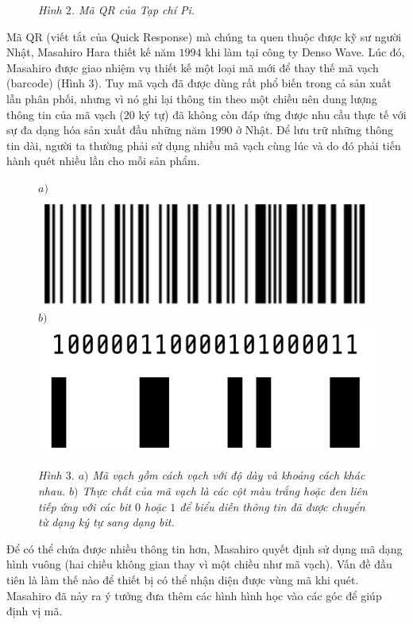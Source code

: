\begin{multicols}{2}
\begin{figure}[H]
			\caption{\small\textit{\color{toanhocdoisong}Hình $2$. Mã QR của Tạp chí Pi.}}
			\vspace*{-10pt}
		\end{figure}
	Mã QR (viết tắt của Quick Response) mà chúng ta quen thuộc được kỹ sư người Nhật, Masahiro Hara thiết kế năm $1994$ khi làm tại công ty Denso Wave. Lúc đó, Masahiro được giao nhiệm vụ thiết kế một loại mã mới để thay thế mã vạch (barcode) (Hình $3$). Tuy mã vạch đã được dùng rất phổ biến trong cả sản xuất lẫn phân phối, nhưng vì nó ghi lại thông tin theo một chiều nên dung lượng thông tin của mã vạch ($20$ ký tự) đã không còn đáp ứng được nhu cầu thực tế với sự đa dạng hóa sản xuất đầu những năm $1990$ ở Nhật. Để lưu trữ những thông tin dài, người ta thường phải sử dụng nhiều mã vạch cùng lúc và do đó phải tiến hành quét nhiều lần cho mỗi sản phẩm.
	\begin{figure}[H]
		\vspace*{-10pt}
		\centering
		\captionsetup{labelformat= empty, justification=centering}
		$a)$\includegraphics[width= 0.8\linewidth]{4}
		$b)$\includegraphics[width= 0.8\linewidth]{5}
		\caption{\small\textit{\color{toanhocdoisong}Hình $3.$ $a)$ Mã vạch gồm cách vạch với độ dày và khoảng cách khác nhau. $b)$ Thực chất của mã vạch là các cột màu trắng hoặc đen liên tiếp ứng với các bit $0$ hoặc $1$ để biểu diễn thông tin đã được chuyển từ dạng ký tự sang dạng bit.}}
		\vspace*{-10pt}
	\end{figure}
	Để có thể chứa được nhiều thông tin hơn, Masahiro quyết định sử dụng mã dạng hình vuông (hai chiều không gian thay vì một chiều như mã vạch). Vấn đề đầu tiên là làm thế nào để thiết bị có thể nhận diện được vùng mã khi quét. Masahiro đã nảy ra ý tưởng đưa thêm các hình hình học vào các góc để giúp định vị mã.

\end{multicols}
